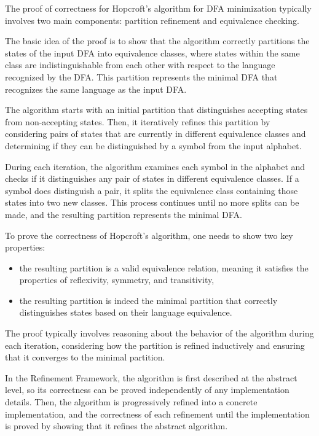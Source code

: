 \documentclass[12pt, a4 paper]{article}
\theoremstyle{definition}
\begin{document}
The proof of correctness for Hopcroft's algorithm for DFA minimization typically involves two main components: partition refinement and equivalence checking.

The basic idea of the proof is to show that the algorithm correctly partitions the states of the input DFA into equivalence classes, where states within the same class are indistinguishable from each other with respect to the language recognized by the DFA. This partition represents the minimal DFA that recognizes the same language as the input DFA.

The algorithm starts with an initial partition that distinguishes accepting states from non-accepting states. Then, it iteratively refines this partition by considering pairs of states that are currently in different equivalence classes and determining if they can be distinguished by a symbol from the input alphabet.

During each iteration, the algorithm examines each symbol in the alphabet and checks if it distinguishes any pair of states in different equivalence classes. If a symbol does distinguish a pair, it splits the equivalence class containing those states into two new classes. This process continues until no more splits can be made, and the resulting partition represents the minimal DFA.

To prove the correctness of Hopcroft's algorithm, one needs to show two key properties:
\begin{itemize}
    \item the resulting partition is a valid equivalence relation, meaning it satisfies the properties of reflexivity, symmetry, and transitivity,
    \item the resulting partition is indeed the minimal partition that correctly distinguishes states based on their language equivalence.
\end{itemize}

The proof typically involves reasoning about the behavior of the algorithm during each iteration, considering how the partition is refined inductively and ensuring that it converges to the minimal partition.

In the Refinement Framework, the algorithm is first described at the abstract level, so its correctness can be proved independently of any implementation details. Then, the algorithm is progressively refined into a concrete implementation, and the correctness of each refinement until the implementation is proved by showing that it refines the abstract algorithm.
\end{document}

